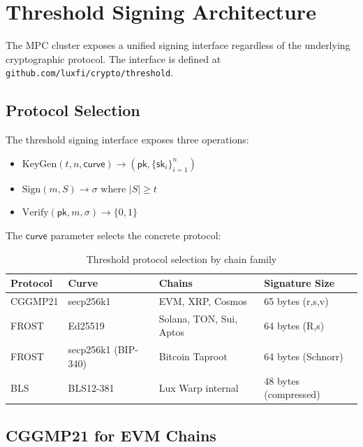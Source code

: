 \section{Threshold Signing Architecture}

\label{sec:threshold}

The MPC cluster exposes a unified signing interface regardless of the underlying cryptographic protocol. The interface is defined at \texttt{github.com/luxfi/crypto/threshold}.

\subsection{Protocol Selection}

\begin{definition}
\label{def:threshold-iface}
The threshold signing interface exposes three operations:
\begin{itemize}[nosep]
  \item $\mathrm{KeyGen}(t, n, \mathsf{curve}) \to (\mathsf{pk}, \{\mathsf{sk}_i\}_{i=1}^{n})$
  \item $\mathrm{Sign}(m, S) \to \sigma$ where $|S| \geq t$
  \item $\mathrm{Verify}(\mathsf{pk}, m, \sigma) \to \{0, 1\}$
\end{itemize}
The $\mathsf{curve}$ parameter selects the concrete protocol:
\end{definition}

\begin{table}[H]
\centering
\begin{tabular}{llll}
\toprule
\textbf{Protocol} & \textbf{Curve} & \textbf{Chains} & \textbf{Signature Size} \\
\midrule
CGGMP21 & secp256k1 & EVM, XRP, Cosmos & 65 bytes (r,s,v) \\
FROST   & Ed25519   & Solana, TON, Sui, Aptos & 64 bytes (R,s) \\
FROST   & secp256k1 (BIP-340) & Bitcoin Taproot & 64 bytes (Schnorr) \\
BLS     & BLS12-381 & Lux Warp internal & 48 bytes (compressed) \\
\bottomrule
\end{tabular}
\caption{Threshold protocol selection by chain family}
\label{tab:protocols}
\end{table}

\subsection{CGGMP21 for EVM Chains}

